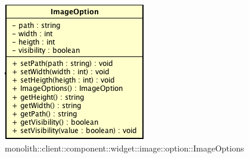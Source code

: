 \label{monolith::client::component::widget::image::option::ImageOptions}
\begin{figure}[H]
	\centering
	\includegraphics[scale=0.5]{Sezioni/SottosezioniST/img/ImageOptions.png}
	\caption{monolith::client::component::widget::image::option::ImageOptions}
\end{figure}

